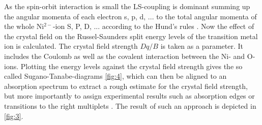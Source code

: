 As the spin-orbit interaction is small the LS-coupling is dominant summing up the angular momenta of each electron s, p, d, ... to the total angular momenta of the whole Ni$^{2-}$-ion S, P, D, ... according to the Hund's rules .
Now the effect of the crystal field on the Russel-Saunders split energy levels of the transition metal ion is calculated.
The crystal field strength $Dq/B$ is taken as a parameter.
It includes the Coulomb as well as the covalent interaction between the Ni- and O-ions.
Plotting the energy levels against the crystal field strength gives the so called Sugano-Tanabe-diagrams \autoref{fig:4}, which can then be aligned to an absorption spectrum to extract a rough estimate for the crystal field strength, but more importantly to assign experimental results such as absorption edges or transitions to the right multiplets .
The result of such an approach is depicted in \autoref{fig:3}.
